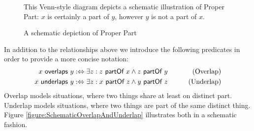 \begin{figure}[h!]
\begin{center}
\end{center}
{
\scriptsize 
This Venn-style diagram depicts a schematic illustration of Proper Part:
$x$ is certainly a part of $y$, however $y$ is not a part of $x$.
}
\caption{A schematic depiction of Proper Part}
\label{figure:SchematicProperPart}
\end{figure}

In addition to the relationships above we introduce the following predicates in order to provide a more concise notation:
\begin{align}
x ~\textsf{overlaps}~ y
&:\Leftrightarrow
\exists z : z ~\textsf{partOf}~ x \wedge z ~\textsf{partOf}~ y
&\qquad \text{(Overlap)}
\label{definition:Overlap}
\\
x ~\textsf{underlaps}~ y
&:\Leftrightarrow
\exists z : x ~\textsf{partOf}~ z \wedge y ~\textsf{partOf}~ z
&\qquad \text{(Underlap)}
\label{definition:Underlap}
\end{align}
Overlap models situations, where two things share at least on distinct part.
Underlap models situations, where two things are part of the same distinct thing.
Figure \ref{figure:SchematicOverlapAndUnderlap} illustrates both in a schematic fashion.

